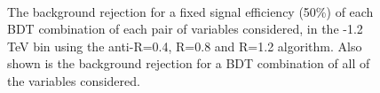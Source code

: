 \begin{figure}
\begin{center}
\\
\caption{The background rejection
for a fixed signal efficiency (50\%) of each BDT combination of
each pair of variables considered, in the -1.2 TeV bin using
the anti-\kT R=0.4, R=0.8 and R=1.2 algorithm. Also shown is the background rejection
for a BDT combination of all of the variables considered.}
\label{fig:pt1000_comb2D}
\end{center}
\end{figure}


